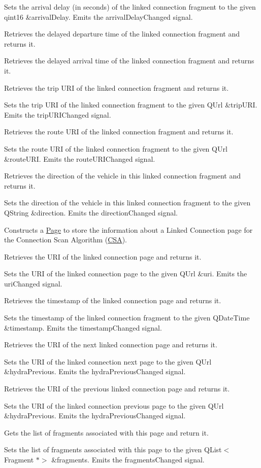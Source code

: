 Sets the arrival delay (in seconds) of the linked connection fragment to the given qint16 \&arrival\+Delay. Emits the arrival\+Delay\+Changed signal.

Retrieves the delayed departure time of the linked connection fragment and returns it.

Retrieves the delayed arrival time of the linked connection fragment and returns it.

Retrieves the trip U\+RI of the linked connection fragment and returns it.

Sets the trip U\+RI of the linked connection fragment to the given Q\+Url \&trip\+U\+RI. Emits the trip\+U\+R\+I\+Changed signal.

Retrieves the route U\+RI of the linked connection fragment and returns it.

Sets the route U\+RI of the linked connection fragment to the given Q\+Url \&route\+U\+RI. Emits the route\+U\+R\+I\+Changed signal.

Retrieves the direction of the vehicle in this linked connection fragment and returns it.

Sets the direction of the vehicle in this linked connection fragment to the given Q\+String \&direction. Emits the direction\+Changed signal.

Constructs a \mbox{\hyperlink{classFragments_1_1Page}{Page}} to store the information about a Linked Connection page for the Connection Scan Algorithm (\mbox{\hyperlink{namespaceCSA}{C\+SA}}).

Retrieves the U\+RI of the linked connection page and returns it.

Sets the U\+RI of the linked connection page to the given Q\+Url \&uri. Emits the uri\+Changed signal.

Retrieves the timestamp of the linked connection page and returns it.

Sets the timestamp of the linked connection fragment to the given Q\+Date\+Time \&timestamp. Emits the timestamp\+Changed signal.

Retrieves the U\+RI of the next linked connection page and returns it.

Sets the U\+RI of the linked connection next page to the given Q\+Url \&hydra\+Previous. Emits the hydra\+Previous\+Changed signal.

Retrieves the U\+RI of the previous linked connection page and returns it.

Sets the U\+RI of the linked connection previous page to the given Q\+Url \&hydra\+Previous. Emits the hydra\+Previous\+Changed signal.

Gets the list of fragments associated with this page and return it.

Sets the list of fragments associated with this page to the given Q\+List$<$\+Fragment $\ast$$>$ \&fragments. Emits the fragments\+Changed signal. 